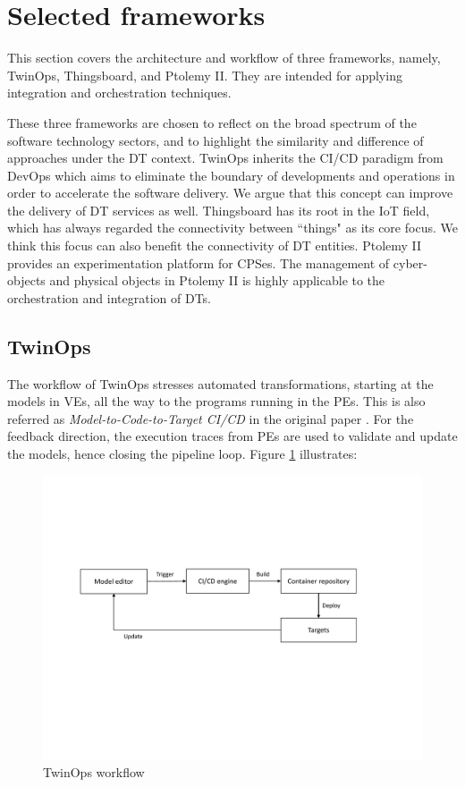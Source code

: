 \section{Selected frameworks} \label{sec:selframe}
This section covers the architecture and workflow of three frameworks, namely, TwinOps, Thingsboard, and Ptolemy II. They are intended for applying integration and orchestration techniques.

These three frameworks are chosen to reflect on the broad spectrum of the software technology sectors, and to highlight the similarity and difference of approaches under the DT context. TwinOps inherits the CI/CD paradigm from DevOps which aims to eliminate the boundary of developments and operations in order to accelerate the software delivery. We argue that this concept can improve the delivery of DT services as well. Thingsboard has its root in the IoT field, which has always regarded the connectivity between ``things" as its core focus. We think this focus can also benefit the connectivity of DT entities. Ptolemy II provides an experimentation platform for CPSes. The management of cyber-objects and physical objects in Ptolemy II is highly applicable to the orchestration and integration of DTs.
 
\subsection{TwinOps} \label{sec:selframe_twop}
The workflow of TwinOps stresses automated transformations, starting at the models in VEs, all the way to the programs running in the PEs. This is also referred as \textit{Model-to-Code-to-Target CI/CD} in the original paper \cite{Hugues2020}. For the feedback direction, the execution traces from PEs are used to validate and update the models, hence closing the pipeline loop. Figure \ref{fig:twinops_workflow} illustrates:

\begin{figure}[hbt!]
  \centering
  \includegraphics[scale=0.6]{figures/twinops_workflow.pdf}
  \caption{TwinOps workflow}
  \label{fig:twinops_workflow}
\end{figure}

